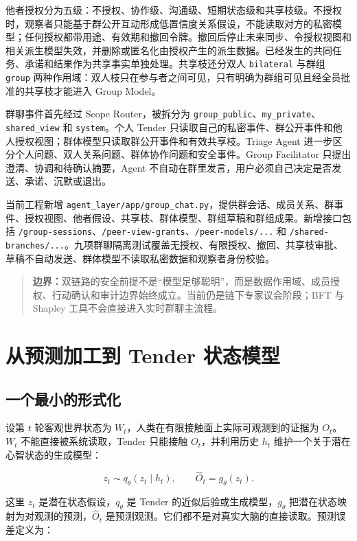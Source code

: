 \documentclass[UTF8,a4paper,11pt]{ctexart}
\newcommand{\boundary}[1]{\begin{quote}\noindent\textbf{\color{TenderPink}边界：}#1\end{quote}}
\begin{document}
他者授权分为五级：不授权、协作级、沟通级、短期状态级和共享枝级。不授权时，观察者只能基于群公开互动形成低置信度关系假设，不能读取对方的私密模型；任何授权都带用途、有效期和撤回令牌。撤回后停止未来同步、令授权视图和相关派生模型失效，并删除或匿名化由授权产生的派生数据。已经发生的共同任务、承诺和结果作为共享事实单独处理。共享枝还分双人 \texttt{bilateral} 与群组 \texttt{group} 两种作用域：双人枝只在参与者之间可见，只有明确为群组可见且经全员批准的共享枝才能进入 Group Model。

群聊事件首先经过 Scope Router，被拆分为 \texttt{group\_public}、\texttt{my\_private}、\texttt{shared\_view} 和 \texttt{system}。个人 Tender 只读取自己的私密事件、群公开事件和他人授权视图；群体模型只读取群公开事件和有效共享枝。Triage Agent 进一步区分个人问题、双人关系问题、群体协作问题和安全事件。Group Facilitator 只提出澄清、协调和待确认摘要，Agent 不自动在群里发言，用户必须自己决定是否发送、承诺、沉默或退出。

当前工程新增 \texttt{agent\_layer/app/group\_chat.py}，提供群会话、成员关系、群事件、授权视图、他者假设、共享枝、群体模型、群组草稿和群组成果。新增接口包括 \texttt{/group-sessions}、\texttt{/peer-view-grants}、\texttt{/peer-models/...} 和 \texttt{/shared-branches/...}。九项群聊隔离测试覆盖无授权、有限授权、撤回、共享枝审批、草稿不自动发送、群体模型不读取私密数据和观察者身份校验。

\boundary{双链路的安全前提不是“模型足够聪明”，而是数据作用域、成员授权、行动确认和审计边界始终成立。当前仍是链下专家议会阶段；BFT 与 Shapley 工具不会直接进入实时群聊主流程。}

\section{从预测加工到 Tender 状态模型}

\subsection{一个最小的形式化}

设第 \(t\) 轮客观世界状态为 \(W_t\)，人类在有限接触面上实际可观测到的证据为 \(O_t\)。\(W_t\) 不能直接被系统读取，Tender 只能接触 \(O_t\)，并利用历史 \(h_t\) 维护一个关于潜在心智状态的生成模型：

\begin{equation}
z_t \sim q_\theta(z_t\mid h_t),\qquad
\hat O_t=g_\theta(z_t).
\end{equation}

这里 \(z_t\) 是潜在状态假设，\(q_\theta\) 是 Tender 的近似后验或生成模型，\(g_\theta\) 把潜在状态映射为对观测的预测，\(\hat O_t\) 是预测观测。它们都不是对真实大脑的直接读取。预测误差定义为：
\end{document}
